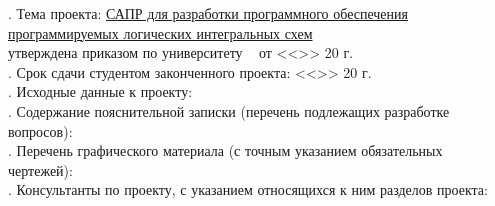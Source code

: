 . Тема проекта: \uline{САПР для разработки программного обеспечения программируемых
логических интегральных схем\hfill}\\
\noindent утверждена приказом по университету \No~\underline{\hspace{1.5cm}} от <<\underline{\hspace{1cm}}>>\underline{\hspace{3.5cm}} 20\underline{\hspace{0.8cm}} г.\\
. Срок сдачи студентом законченного проекта: \hspace{0.8cm} <<\underline{\hspace{1cm}}>>\underline{\hspace{3.5cm}} 20\underline{\hspace{0.8cm}} г.\\
. Исходные данные к проекту: \uline{\hfill}\\
\noindent \underline{\hspace{\textwidth}}
\noindent \underline{\hspace{\textwidth}}
\noindent \underline{\hspace{\textwidth}}
. Содержание пояснительной записки (перечень подлежащих разработке вопросов): \uline{\hfill}\\
\noindent \underline{\hspace{\textwidth}}
\noindent \underline{\hspace{\textwidth}}
. Перечень графического материала (с точным указанием обязательных чертежей): \uline{\hfill}\\
\noindent \underline{\hspace{\textwidth}}
\noindent \underline{\hspace{\textwidth}}
\noindent \underline{\hspace{\textwidth}}
. Консультанты по проекту, с указанием относящихся к ним разделов проекта: \uline{\hfill}\\
\noindent \underline{\hspace{\textwidth}}
\noindent \underline{\hspace{\textwidth}}
\noindent \underline{\hspace{\textwidth}}
\noindent \underline{\hspace{\textwidth}}

